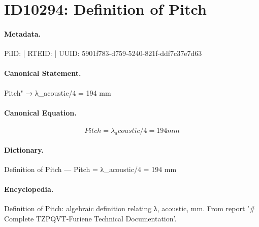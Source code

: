 \section*{ID10294: Definition of Pitch}
\paragraph{Metadata.}
PiID:  | RTEID:  | UUID: 5901f783-d759-5240-821f-ddf7c37e7d63

\paragraph{Canonical Statement.}
Pitch" → λ\_acoustic/4 = 194 mm

\paragraph{Canonical Equation.}
\[
Pitch = λ_acoustic/4 = 194 mm
\]

\paragraph{Dictionary.}
Definition of Pitch — Pitch = λ\_acoustic/4 = 194 mm

\paragraph{Encyclopedia.}
Definition of Pitch: algebraic definition relating λ, acoustic, mm. From report '\# Complete TZPQVT-Furiene Technical Documentation'.
